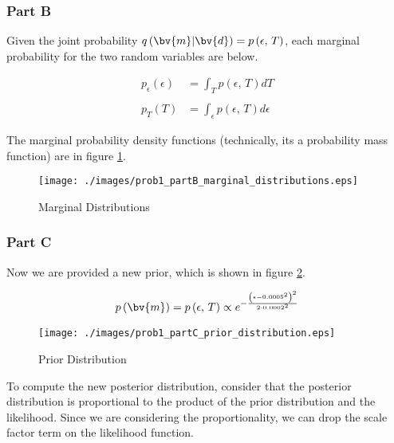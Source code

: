 \subsubsection{Part B}

Given the joint probability $q\left(\bv{m}|\bv{d}\right) = p\left(\epsilon,\,T\right)$, each marginal probability for the two random variables are below. 

\begin{align*}
	p_\epsilon(\epsilon) &= \int_{T} p\left(\epsilon,\,T\right) dT \\
	\\
	p_T(T) &= \int_{\epsilon} p\left(\epsilon,\,T\right) d\epsilon
\end{align*}

The marginal probability density functions (technically, its a probability mass function) are in figure \ref{fig: prob1 marginal distributions}.

\begin{figure}[h] 
	\centering
	\texttt{[image: ./images/prob1\_partB\_marginal\_distributions.eps]}
	\caption{Marginal Distributions}
	\label{fig: prob1 marginal distributions}
\end{figure}
\FloatBarrier


\subsubsection{Part C}

Now we are provided a new prior, which is shown in figure \ref{fig: prob1 partC prior distribution}. 

\begin{align*}
	p\left(\bv{m}\right) = p\left(\epsilon,\,T\right) \propto e^{-\frac{\left(\epsilon - 0.0005^2\right)^2}{2 \cdot 0.0002^2}}
\end{align*}

\begin{figure}[h] 
	\centering
	\texttt{[image: ./images/prob1\_partC\_prior\_distribution.eps]}
	\caption{Prior Distribution}
	\label{fig: prob1 partC prior distribution}
\end{figure}
\FloatBarrier

To compute the new posterior distribution, consider that the posterior distribution is proportional to the product of the prior distribution and the likelihood. Since we are considering the proportionality, we can drop the scale factor term on the likelihood function. 

